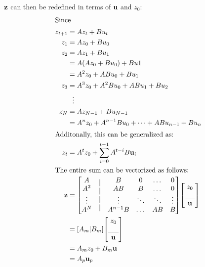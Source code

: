 \documentclass[letter]{article}
\begin{document}
$\vb{z}$ can then be redefined in terms of $\vb{u}$ and $z_0$:
\begin{align*}
\intertext{Since}
	z_{t+1} &= A z_{t} + B u_{t}\\
	z_{1} 	&= A z_{0} + B u_{0}\\
	z_{2} 	&= A z_{1} + B u_{1}\\
			&= A \qty(A z_{0} + B u_{0}) + B u{1}\\
			&= A^2 z_0 + AB u_0 + B u_1\\
	z_{3}	&= A^3 z_0 + A^2 B u_0 + A B u_1 + B u_2\\
			& \ \ \vdots\\
	z_{N}	&= A z_{N-1} + B u_{N-1}\\
			&= A^n z_0 + A^{n-1} B u_0 + \dots + A B u_{n-1} + B u_n\\
\intertext{Additonally, this can be generalized as:}
	z_{t}	&= A^{t} z_0 + \sum_{i=0}^{t-1} A^{t-i} B \vb{u}_{i}\\
\intertext{The entire sum can be vectorized as follows:}
	\vb{z}	&= \mqty[\mqty{A \\ A^2 \\ \vdots \\ A^N} 
					& \mqty{|\\|\\|\\|} 
					& \mqty{B 	& 0 & \dots & 0\\
							AB 	& B & \dots & 0\\
							\vdots & \ddots &\ddots &\vdots\\
							A^{n-1}B &\dots &AB &B}] \mqty[z_0\\ \_\_ \\ \vb{u}]\\
			&= [A_{m} | B_{m}] \mqty[z_0\\ \_\_ \\ \vb{u}]\\
			&= A_m z_0 + B_m \vb{u} \\
			&= A_p \vb{u}_p
\end{align*}
\end{document}
